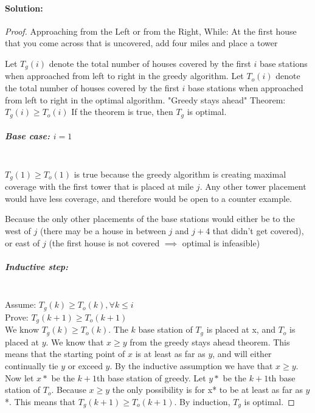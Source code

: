 \documentclass[12pt]{article}
\begin{document}
\paragraph{Solution:}
\begin{proof}
Approaching from the Left or from the Right,
While: At the first house that you come across that is uncovered, add
four miles and place a tower

Let $T_g(i)$ denote the total number of houses covered by the first $i$
base stations when approached from left to right in the greedy
algorithm.  Let $T_o(i)$ denote the total number of houses covered by
the first $i$ base stations when approached from left to right in the
optimal algorithm.  "Greedy stays ahead" Theorem: $T_g(i) \ge T_o(i)$
If the theorem is true, then $T_g$ is optimal.

\subparagraph{Base case: $i = 1$}\mbox{}\\
$T_g(1) \ge T_o(1)$ is true because the greedy algorithm is creating
maximal coverage with the first tower that is placed at mile $j$.  Any
other tower placement would have less coverage, and therefore would be
open to a counter example.

Because the only other placements of the base stations would either be
to the west of $j$ (there may be a house in between $j$ and $j+4$ that
didn't get covered), or east of $j$ (the first house is not covered
$\implies$ optimal is infeasible)

\subparagraph{Inductive step:}\mbox{}\\
\indent \indent Assume: $T_g(k) \ge T_o(k), \forall k \le i$ \\
\indent \indent Prove: $T_g(k+1) \ge T_o(k+1)$ \\

We know $T_g(k) \ge T_o(k)$.  The $k$ base station of $T_g$ is placed at
x, and $T_o$ is placed at $y$.  We know that $x \ge y$ from the greedy
stays ahead theorem. 
This means that the starting point of $x$ is at least
as far as $y$, and will either continually tie $y$ or exceed $y$.  By the
inductive assumption we have that $x \ge y$.  Now let $x*$ be the $k+1$th
base station of greedy.  Let $y*$ be the $k+1$th base station of $T_o$.
Because $x \ge y$ the only possibility is for x* to be at least as far
as $y$*.  This means that $T_g(k+1) \ge T_o(k+1)$.  By induction, $T_g$ is
optimal.

\end{proof}
\end{document}
